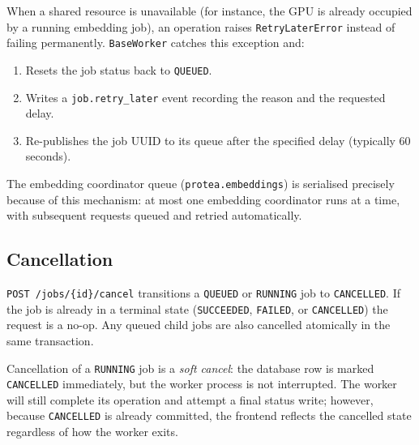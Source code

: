 When a shared resource is unavailable (for instance, the GPU is already
occupied by a running embedding job), an operation raises
\texttt{RetryLaterError} instead of failing permanently. \texttt{BaseWorker}
catches this exception and:

\begin{enumerate}
  \item Resets the job status back to \texttt{QUEUED}.
  \item Writes a \texttt{job.retry\_later} event recording the reason and
    the requested delay.
  \item Re-publishes the job UUID to its queue after the specified delay
    (typically 60 seconds).
\end{enumerate}

The embedding coordinator queue (\texttt{protea.embeddings}) is serialised
precisely because of this mechanism: at most one embedding coordinator runs at
a time, with subsequent requests queued and retried automatically.

\subsection{Cancellation}
\label{subsec:cancellation}

\texttt{POST /jobs/\{id\}/cancel} transitions a \texttt{QUEUED} or
\texttt{RUNNING} job to \texttt{CANCELLED}. If the job is already in a
terminal state (\texttt{SUCCEEDED}, \texttt{FAILED}, or \texttt{CANCELLED})
the request is a no-op. Any queued child jobs are also cancelled atomically
in the same transaction.

Cancellation of a \texttt{RUNNING} job is a \textit{soft cancel}: the database
row is marked \texttt{CANCELLED} immediately, but the worker process is not
interrupted. The worker will still complete its operation and attempt a final
status write; however, because \texttt{CANCELLED} is already committed, the
frontend reflects the cancelled state regardless of how the worker exits.

